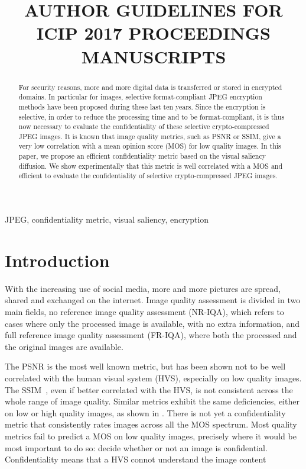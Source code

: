 \documentclass{article}
\title{AUTHOR GUIDELINES FOR ICIP 2017 PROCEEDINGS MANUSCRIPTS}
\begin{document}
%
\maketitle
%
\begin{abstract}
For security reasons, more and more digital data is transferred or stored in encrypted domains.  In particular for images, selective format-compliant JPEG encryption methods have been proposed during these last ten years. Since the encryption is selective, in order to reduce the processing time and to be format-compliant, it is thus now necessary to evaluate the confidentiality of these selective crypto-compressed JPEG images. It is known that image quality metrics, such as PSNR or SSIM, give a very low correlation with a mean opinion score (MOS) for low quality images. In this paper, we propose an efficient confidentiality metric based on the visual saliency diffusion. We show experimentally that this metric is well correlated with a MOS and efficient to evaluate the confidentiality of selective crypto-compressed JPEG images.
\end{abstract}
%
\begin{keywords}
JPEG, confidentiality metric, visual saliency, encryption
\end{keywords}
%
\section{Introduction}
\label{sec:intro}
With the increasing use of social media, more and more pictures are spread, shared and exchanged on the internet. Image quality assessment is divided in two main fields, no reference image quality assessment (NR-IQA), which refers to cases where only the processed image is available, with no extra information, and full reference image quality assessment (FR-IQA), where both the processed and the original images are available.

The PSNR is the most well known metric, but has been shown not to be well correlated with the human visual system (HVS), especially on low quality images. The SSIM~\cite{wang2004image}, even if better correlated with the HVS, is not consistent across the whole range of image quality. Similar metrics \cite{sheikh2006image, yao2009visual, tong2010visual, sun2011objective} exhibit the same deficiencies, either on low or high quality images, as shown in \cite{hofbauer2016identifying}. There is not yet a confidentiality metric that consistently rates images across all the MOS spectrum. Most quality metrics fail to predict a MOS on low quality images, precisely where it would be most important to do so: decide whether or not an image is confidential. Confidentiality means that a HVS connot understand the image content
\end{document}
